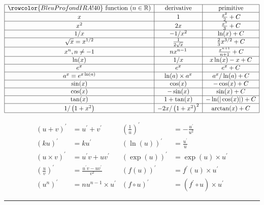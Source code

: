 \begin{f}
\renewcommand{\arraystretch}{1.5}
\[
\begin{array}{|c|c|c|}
\hline \rowcolor{BleuProfondIRA!40} \text { function }(n \in \mathbb{R}) & \text { derivative } & \text { primitive } \\
\hline x & 1 & \frac{x^2}{2}+C \\
\hline x^2 & 2 x & \frac{x^3}{3}+C \\
\hline 1 / x & -1 / x^2 & \ln (x)+C \\
\hline \sqrt{x}=x^{1 / 2} & \frac{1}{2 \sqrt{x}} & \frac{2}{3} x^{3 / 2}+C \\
\hline x^n, n \neq-1 & n x^{n-1} & \frac{x^{n+1}}{n+1}+C \\
\hline \ln (x) & 1 / x & x \ln (x)-x+C \\
\hline e^x & e^x & e^x+C \\
\hline a^x=e^{x \ln (a)} & \ln (a) \times a^x & a^x / \ln (a)+C \\
\hline \sin (x) & \cos (x) & -\cos (x)+C \\
\hline \cos (x) & -\sin (x) & \sin (x)+C \\
\hline \tan (x) & 1+\tan (x) & -\ln (|\cos (x)|)+C \\
\hline 1 /\left(1+x^2\right) & -2 x /\left(1+x^2\right)^2 & \arctan (x)+C \\
\hline
\end{array}
\]
\renewcommand{\arraystretch}{1}

\[
    \begin{array}{rl|rl}
(u+v)^{\prime} & =u^{\prime}+v^{\prime} & \left(\frac{1}{u}\right)^{\prime} & =-\frac{u^{\prime}}{u^2} \\
(k u)^{\prime} & =k u^{\prime} & (\ln (u))^{\prime} & =\frac{u^{\prime}}{u} \\
(u \times v)^{\prime} & =u^{\prime} v+u v^{\prime} & (\exp (u))^{\prime} & =\exp (u) \times u^{\prime} \\
\left(\frac{u}{v}\right)^{\prime} & =\frac{u^{\prime} v-u v^{\prime}}{v^2} & (f(u))^{\prime} & =f^{\prime}(u) \times u^{\prime} \\
\left(u^n\right)^{\prime} & =n u^{n-1} \times u^{\prime} & (f \circ u)^{\prime} & =\left(f^{\prime} \circ u\right) \times u^{\prime}
\end{array}
\]
\end{f}

\hrule

